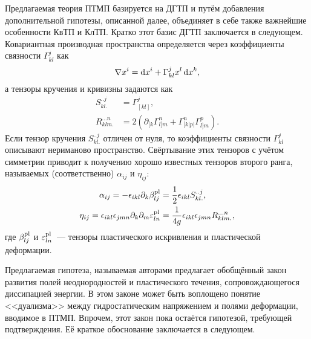 \documentclass[a4paper, 14pt, titlepage]{extarticle}
\newcommand{\plast}{\textup{pl}} %
\newcommand{\Sklj}{S^{..j}_{kl.}}  %
\newcommand{\Rklmn}{R^{...n}_{klm.}} %
\begin{document}
  Предлагаемая теория ПТМП базируется на ДГТП и путём добавления дополнительной гипотезы, описанной
  далее, объединяет в себе также важнейшие особенности КвТП и КлТП. Кратко этот базис ДГТП
  заключается в следующем. Ковариантная производная пространства определяется через коэффициенты
  связности $\Gamma^j_{kl}$ как
  \[
    \nabla x^i = \dif x^i + \Gamma^j_{kl} x^l \dif x ^k,
  \]
  а тензоры кручения и кривизны задаются как
  \begin{align*}
    \Sklj  & = \Gamma^j_{[kl]}, \\
    \Rklmn & = 2\left( \partial_{[k}\Gamma^n_{l]m} + \Gamma^n_{[k|p|}\Gamma^p_{l]m} \right).
  \end{align*}
  Если тензор кручения $\Sklj$ отличен от нуля, то коэффициенты связности $\Gamma^j_{kl}$ описывают
  нериманово пространство. Свёртывание этих тензоров с учётом симметрии приводит к получению хорошо
  известных тензоров второго ранга, называемых (соответственно) 
  $\alpha_{ij}$ и  $\eta_{ij}$:
  \begin{align*}
    \alpha_{ij} = - \epsilon_{ikl} \partial_k \beta^{\plast}_{lj}
              & = \frac{1}{2} \epsilon_{ikl}\Sklj,\\
    \eta_{ij}   = \epsilon_{ikl}\epsilon_{jmn} \partial_k\partial_m \varepsilon^{\plast}_{ln}
              & = \frac{1}{4g}\epsilon_{ikl}\epsilon_{jmn}\Rklmn,
  \end{align*}
  где $\beta^{\plast}_{lj}$ и $\varepsilon^{\plast}_{ln}$~--- тензоры пластического искривления и
  пластической деформации.

  Предлагаемая гипотеза, называемая авторами  предлагает обобщённый
  закон развития полей неоднородностей и пластического течения, сопровождающегося диссипацией
  энергии. В этом законе может быть воплощено понятие <<дуализма>> между гидростатическим
  напряжением и полями деформации, вводимое в ПТМП. Впрочем, этот закон пока остаётся гипотезой,
  требующей подтверждения. Её краткое обоснование заключается в следующем.
\end{document}
